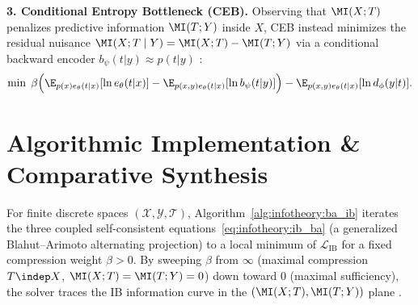 \documentclass[../../../../master.tex]{subfiles}
\begin{document}
\begin{coremath}
\textbf{3. Conditional Entropy Bottleneck (CEB).} Observing that $\MI(X; T)$ penalizes predictive information $\MI(T; Y)$ inside $X$, CEB instead minimizes the residual nuisance $\MI(X; T \mid Y) = \MI(X; T) - \MI(T; Y)$ via a conditional backward encoder $b_\psi(t|y) \approx p(t|y)$ :
\begin{equation}
\label{eq:infotheory:ceb}
  \min \;\beta\Bigl(\E_{p(x)e_\theta(t|x)}[\ln e_\theta(t|x)] - \E_{p(x,y)e_\theta(t|x)}[\ln b_\psi(t|y)]\Bigr) - \E_{p(x,y)e_\theta(t|x)}[\ln d_\phi(y|t)].
\end{equation}
\end{coremath}

\section{Algorithmic Implementation \& Comparative Synthesis}
\label{sec:infotheory:algorithms}

For finite discrete spaces $(\mathcal{X}, \mathcal{Y}, \mathcal{T})$, Algorithm~\ref{alg:infotheory:ba_ib} iterates the three coupled self-consistent equations~\eqref{eq:infotheory:ib_ba} (a generalized Blahut--Arimoto alternating projection) to a local minimum of $\mathcal{L}_{\mathrm{IB}}$ for a fixed compression weight $\beta > 0$. By sweeping $\beta$ from $\infty$ (maximal compression $T \indep X$, $\MI(X;T)=\MI(T;Y)=0$) down toward $0$ (maximal sufficiency), the solver traces the IB information curve in the $(\MI(X;T), \MI(T;Y))$ plane .
\end{document}
